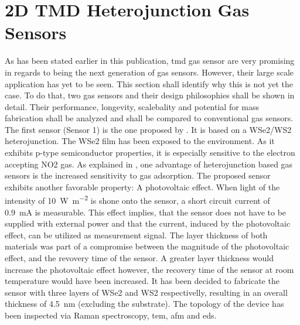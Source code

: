 \section{2D TMD Heterojunction Gas Sensors}
\label{sec:2d_tmd_heterojunction_gas_sensors}

As has been stated earlier in this publication, \gls{tmd} gas sensor are very promising in regards to being the next generation of gas sensors. However, their large scale application has yet to be seen. This section shall identify why this is not yet the case. To do that, two gas sensors and their design philosophies shall be shown in detail. Their performance, longevity, scalebality and potential for mass fabrication shall be analyzed and shall be compared to conventional gas sensors.  \\
The first sensor (Sensor 1) is the one proposed by \cite{Kim2020}. It is based on a WSe2/WS2  heterojunction. The WSe2 film has been exposed to the environment. As it exhibits p-type semiconductor properties, it is especially sensitive to the electron accepting NO2 gas. As explained in , one advantage of heterojunction based gas sensors is the increased sensitivity to gas adsorption. The proposed sensor exhibits another favorable property: A photovoltaic effect. When light of the intensity of \SI{10}{\watt\per\meter^2} is shone onto the sensor, a short circuit current of \SI{0.9}{\milli\ampere} is measurable. This effect implies, that the sensor does not have to be supplied with external power and that the current, induced by the photovoltaic effect, can be utilized as measurement signal. The layer thickness of both materials was part of a compromise between the magnitude of the photovoltaic effect, and the revovery time of the sensor. A greater layer thickness would increase the photovoltaic effect however, the recovery time of the sensor at room temperature would have been increased. It has been decided to fabricate the sensor with three layers of WSe2 and WS2 respectivelly, resulting in an overall thickness of \SI{4.5}{\nano\meter} (excluding the substrate). The topology of the device has been inspected via Raman spectroscopy, \gls{tem}, \gls{afm} and \gls{eds}. \\
